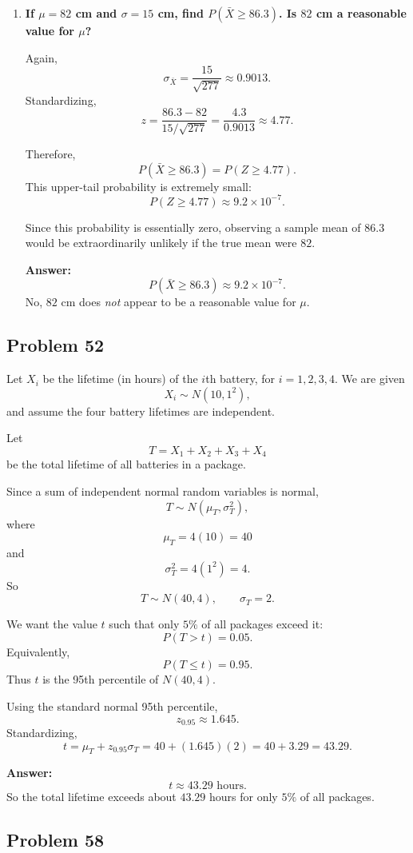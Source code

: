 \documentclass[11pt]{article}
\begin{document}
\begin{enumerate}
    \item[(c)] \textbf{If $\mu=82$ cm and $\sigma=15$ cm, find $P(\bar{X}\ge 86.3)$. Is $82$ cm a reasonable value for $\mu$?}

    Again,
    \[
    \sigma_{\bar{X}}=\frac{15}{\sqrt{277}}\approx 0.9013.
    \]
    Standardizing,
    \[
    z=\frac{86.3-82}{15/\sqrt{277}}
    =\frac{4.3}{0.9013}\approx 4.77.
    \]

    Therefore,
    \[
    P(\bar{X}\ge 86.3)=P(Z\ge 4.77).
    \]
    This upper-tail probability is extremely small:
    \[
    P(Z\ge 4.77)\approx 9.2\times 10^{-7}.
    \]

    Since this probability is essentially zero, observing a sample mean of $86.3$ would be extraordinarily unlikely if the true mean were $82$.

    \textbf{Answer:}
    \[
    P(\bar{X}\ge 86.3)\approx 9.2\times 10^{-7}.
    \]
    No, $82$ cm does \emph{not} appear to be a reasonable value for $\mu$.
\end{enumerate}

\subsection*{Problem 52}

Let $X_i$ be the lifetime (in hours) of the $i$th battery, for $i=1,2,3,4$. We are given
\[
X_i \sim N(10,1^2),
\]
and assume the four battery lifetimes are independent.

Let
\[
T=X_1+X_2+X_3+X_4
\]
be the total lifetime of all batteries in a package.

Since a sum of independent normal random variables is normal,
\[
T \sim N(\mu_T,\sigma_T^2),
\]
where
\[
\mu_T=4(10)=40
\]
and
\[
\sigma_T^2=4(1^2)=4.
\]
So
\[
T\sim N(40,4), \qquad \sigma_T=2.
\]

We want the value $t$ such that only $5\%$ of all packages exceed it:
\[
P(T>t)=0.05.
\]
Equivalently,
\[
P(T\le t)=0.95.
\]
Thus $t$ is the 95th percentile of $N(40,4)$.

Using the standard normal 95th percentile,
\[
z_{0.95}\approx 1.645.
\]
Standardizing,
\[
t=\mu_T+z_{0.95}\sigma_T
=40+(1.645)(2)
=40+3.29
=43.29.
\]

\textbf{Answer:}
\[
t\approx 43.29 \text{ hours}.
\]
So the total lifetime exceeds about $43.29$ hours for only $5\%$ of all packages.

\subsection*{Problem 58}
\end{document}
